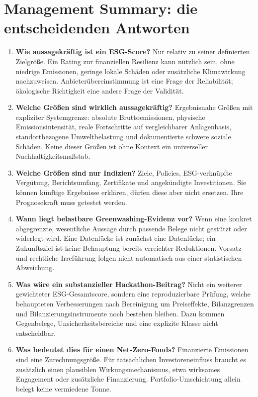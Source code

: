 \documentclass[11pt,a4paper]{article}
\begin{document}
\section{Management Summary: die entscheidenden Antworten}
\label{sec:summary}
\begin{enumerate}
\item \textbf{Wie aussagekräftig ist ein ESG-Score?} Nur relativ zu seiner definierten Zielgröße. Ein Rating zur finanziellen Resilienz kann nützlich sein, ohne niedrige Emissionen, geringe lokale Schäden oder zusätzliche Klimawirkung nachzuweisen. Anbieterübereinstimmung ist eine Frage der Reliabilität; ökologische Richtigkeit eine andere Frage der Validität.
\item \textbf{Welche Größen sind wirklich aussagekräftig?} Ergebnisnahe Größen mit expliziter Systemgrenze: absolute Bruttoemissionen, physische Emissionsintensität, reale Fortschritte auf vergleichbarer Anlagenbasis, standortbezogene Umweltbelastung und dokumentierte schwere soziale Schäden. Keine dieser Größen ist ohne Kontext ein universeller Nachhaltigkeitsmaßstab.
\item \textbf{Welche Größen sind nur Indizien?} Ziele, Policies, ESG-verknüpfte Vergütung, Berichtsumfang, Zertifikate und angekündigte Investitionen. Sie können künftige Ergebnisse erklären, dürfen diese aber nicht ersetzen. Ihre Prognosekraft muss getestet werden.
\item \textbf{Wann liegt belastbare Greenwashing-Evidenz vor?} Wenn eine konkret abgegrenzte, wesentliche Aussage durch passende Belege nicht gestützt oder widerlegt wird. Eine Datenlücke ist zunächst eine Datenlücke; ein Zukunftsziel ist keine Behauptung bereits erreichter Reduktionen. Vorsatz und rechtliche Irreführung folgen nicht automatisch aus einer statistischen Abweichung.
\item \textbf{Was wäre ein substanzieller Hackathon-Beitrag?} Nicht ein weiterer gewichteter ESG-Gesamtscore, sondern eine reproduzierbare Prüfung, welche behaupteten Verbesserungen nach Bereinigung um Preiseffekte, Bilanzgrenzen und Bilanzierungsinstrumente noch bestehen bleiben. Dazu kommen Gegenbelege, Unsicherheitsbereiche und eine explizite Klasse \glqq nicht entscheidbar\grqq.
\item \textbf{Was bedeutet dies für einen Net-Zero-Fonds?} Finanzierte Emissionen sind eine Zurechnungsgröße. Für tatsächlichen Investoreneinfluss braucht es zusätzlich einen plausiblen Wirkungsmechanismus, etwa wirksames Engagement oder zusätzliche Finanzierung. Portfolio-Umschichtung allein belegt keine vermiedene Tonne.
\end{enumerate}
\end{document}

